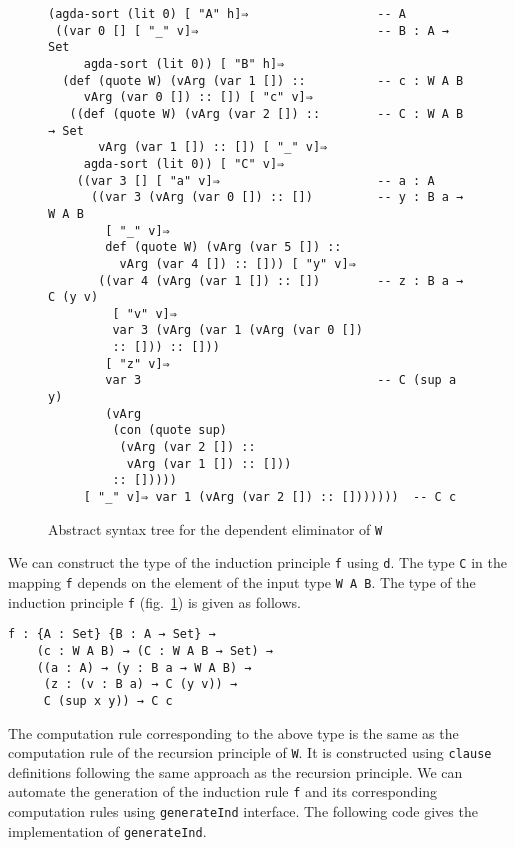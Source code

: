 \documentclass[sigplan,10pt]{acmart}
\begin{document}
\begin{figure}
\begin{center}
\begingroup
\fontsize{7pt}{9pt}\selectfont
\begin{Verbatim}[frame = single]
(agda-sort (lit 0) [ "A" h]⇒                  -- A
 ((var 0 [] [ "_" v]⇒                         -- B : A → Set
     agda-sort (lit 0)) [ "B" h]⇒
  (def (quote W) (vArg (var 1 []) ::          -- c : W A B
     vArg (var 0 []) :: []) [ "c" v]⇒
   ((def (quote W) (vArg (var 2 []) ::        -- C : W A B → Set
       vArg (var 1 []) :: []) [ "_" v]⇒
     agda-sort (lit 0)) [ "C" v]⇒
    ((var 3 [] [ "a" v]⇒                      -- a : A
      ((var 3 (vArg (var 0 []) :: [])         -- y : B a → W A B
        [ "_" v]⇒
        def (quote W) (vArg (var 5 []) :: 
          vArg (var 4 []) :: [])) [ "y" v]⇒
       ((var 4 (vArg (var 1 []) :: [])        -- z : B a → C (y v)
         [ "v" v]⇒
         var 3 (vArg (var 1 (vArg (var 0 []) 
         :: [])) :: []))
        [ "z" v]⇒
        var 3                                 -- C (sup a y)
        (vArg
         (con (quote sup)
          (vArg (var 2 []) :: 
           vArg (var 1 []) :: []))
         :: []))))
     [ "_" v]⇒ var 1 (vArg (var 2 []) :: []))))))  -- C c
\end{Verbatim}
\endgroup
\end{center}
\caption{Abstract syntax tree for the dependent eliminator of {\tt W}}
\label{fig:ast-d'}
\end{figure}
\normalsize

We can construct the type of the induction principle {\tt f} using {\tt d}. The type {\tt C} in the mapping {\tt f} depends on the element of the input type {\tt W A B}. The type of the induction principle {\tt f} (fig.~\ref{fig:ast-d'}) is given as follows.
\begin{center}
\begingroup
\begin{BVerbatim}
f : {A : Set} {B : A → Set} → 
    (c : W A B) → (C : W A B → Set) → 
    ((a : A) → (y : B a → W A B) → 
     (z : (v : B a) → C (y v)) → 
     C (sup x y)) → C c
\end{BVerbatim}
\endgroup
\end{center}
The computation rule corresponding to the above type is the same as the computation rule of the recursion principle of {\tt W}. It is constructed using {\tt clause} definitions following the same approach as the recursion principle.  We can automate the generation of the induction rule {\tt f} and its corresponding computation rules using {\tt generateInd} interface. The following code gives the implementation of {\tt generateInd}.
\end{document}

